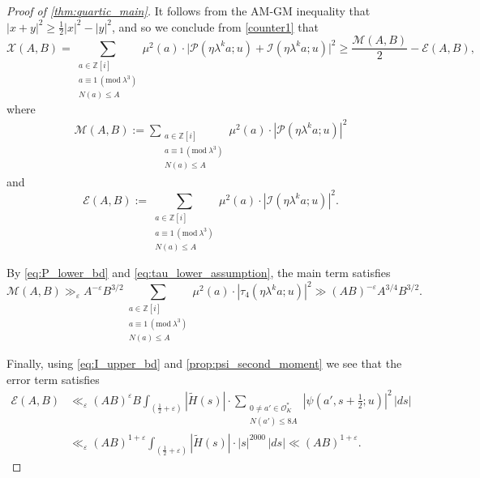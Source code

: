 \documentclass[12pt,reqno]{amsart}
\numberwithin{equation}{section}
\renewcommand{\pmod}[1]{\, (\mathrm{mod}\ #1)}
\begin{document}
\begin{proof}[Proof of \cref{thm:quartic_main}]
It follows from the AM-GM inequality that $|{x+y}|^2 \geq \frac{1}{2}|{x}|^2 - |{y}|^2$, and so we conclude from \eqref{counter1} that
    \begin{equation} \label{Xexpression}
        \mathcal{X}(A, B) = \sum_{\substack{ a \in \mathbb{Z}[i] \\ a \equiv 1 \pmod{\lambda^3} \\ N(a) \leq A}} \mu^2(a) \cdot \big| \mathcal{P}(\eta \lambda^k a; u) + \mathcal{I}(\eta \lambda^k a; u) \big|^2 \geq \frac{\mathcal{M}(A, B)}{2} - \mathcal{E}(A, B),
    \end{equation}
    where
    \begin{align} \label{Mdef}
        \mathcal{M}(A, B):= \sum_{\substack{ a \in \mathbb{Z}[i] \\ a \equiv 1 \pmod{\lambda^3} \\ N(a) \leq A  }} \mu^2(a) \cdot |{\mathcal{P}(\eta \lambda^k a; u)}|^2
    \end{align}
    and
    \begin{equation} \label{Edef}
        \mathcal{E}(A, B) := \sum_{\substack{ a \in \mathbb{Z}[i] \\ a \equiv 1 \pmod{\lambda^3} \\ N(a) \leq A  }} \mu^2(a) \cdot |{\mathcal{I}(\eta \lambda^k a; u)}|^2.
    \end{equation}
   
 By \eqref{eq:P_lower_bd} and \eqref{eq:tau_lower_assumption}, the main term satisfies
    \begin{equation}\label{eq:M_lower_bd}
        \mathcal{M}(A, B) \gg_\varepsilon A^{-\varepsilon} B^{3/2} \sum_{\substack{ a \in \mathbb{Z}[i] \\ a \equiv 1 \pmod{\lambda^3} \\ N(a) \leq A  }} \mu^2(a) \cdot |{\tau_4(\eta \lambda^k a; u)}|^2 \gg (AB)^{-\varepsilon} A^{3/4} B^{3/2}.
    \end{equation}

    Finally, using \eqref{eq:I_upper_bd} and \cref{prop:psi_second_moment} we see that the error term satisfies
    \begin{align}
        \mathcal{E}(A, B) &\ll_{\varepsilon} (AB)^{\varepsilon} B \int_{(\frac{1}{2}+\varepsilon)} |{\widetilde{H}(s)}| \cdot \sum_{\substack{0 \neq a' \in \mathcal{O}^*_K \\ N(a') \leq 8A}} |{\psi(a', s+\tfrac{1}{2}; u)}|^2 \, |{ds}| \nonumber \\
        & \ll_{\varepsilon} (AB)^{1 + \varepsilon} \int_{(\frac{1}{2}+\varepsilon)} |{\widetilde{H}(s)}| \cdot |{s}|^{2000} \, |{ds}| \ll (AB)^{1 + \varepsilon}. \label{eq:E_upper_bd}
    \end{align}
    

\end{proof}
\end{document}
